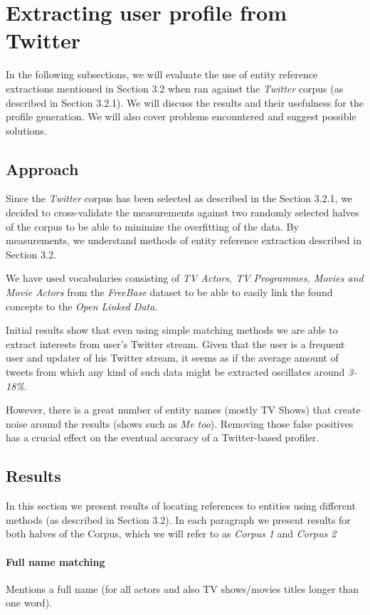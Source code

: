 \section{Extracting user profile from Twitter}

In the following subsections, we will evaluate the use of entity reference extractions
mentioned in Section 3.2 when ran against the \textit{Twitter} corpus (as described in Section 3.2.1).
We will discuss the results and their usefulness for the profile generation. We will also cover problems
encountered and suggest possible solutions.

\subsection{Approach}
Since the \textit{Twitter} corpus has been selected as described in the Section 3.2.1,
we decided to cross-validate the measurements against two randomly selected halves of the corpus
to be able to minimize the overfitting of the data. By measurements, we understand methods of
entity reference extraction described in Section 3.2.

We have used vocabularies consisting of \textit{TV Actors, TV Programmes, Movies and Movie Actors} from
the \textit{FreeBase} dataset to be able to easily link the found concepts to the \textit{Open Linked Data}.

Initial results show that even using simple matching methods we are able to extract interests from
user's Twitter stream. Given that the user is a frequent user and updater of his Twitter stream, it seems
as if the average amount of tweets from which any kind of such data might be extracted oscillates around \textit{3-18\%}.

However, there is a great number of entity names (mostly TV Shows) that create noise around the results (shows such as \textit{Me too}). Removing those false positives has a crucial effect on the eventual accuracy of a Twitter-based profiler.

\subsection{Results}
In this section we present results of locating references to entities using different methods (as described in Section 3.2).
In each paragraph we present results for both halves of the Corpus, which we will refer to as \textit{Corpus 1} and
\textit{Corpus 2}

\paragraph{Full name matching}
Mentions a full name (for all actors and also TV shows/movies titles longer
than one word).

